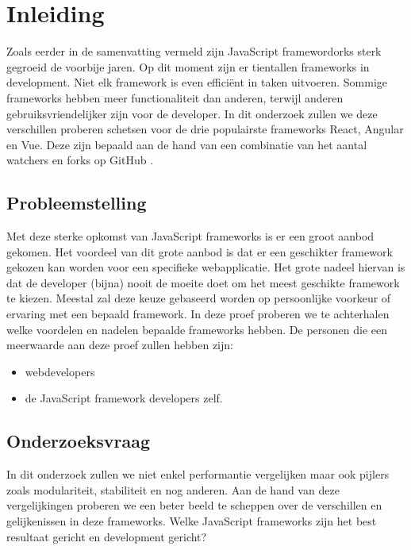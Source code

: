 
\chapter{Inleiding}
\label{ch:inleiding}

Zoals eerder in de samenvatting vermeld zijn JavaScript framewordorks sterk gegroeid de voorbije jaren. Op dit moment zijn er tientallen frameworks in development. Niet elk framework is even efficiënt in taken uitvoeren. Sommige frameworks hebben meer functionaliteit dan anderen, terwijl anderen gebruiksvriendelijker zijn voor de developer. In dit onderzoek zullen we deze verschillen proberen schetsen voor de drie populairste frameworks React, Angular en Vue. Deze zijn bepaald aan de hand van een combinatie van het aantal watchers en forks op GitHub \autocite{github_front-end_????}.

\section{Probleemstelling}
\label{sec:probleemstelling}

Met deze sterke opkomst van JavaScript frameworks is er een groot aanbod gekomen. Het voordeel van dit grote aanbod is dat er een geschikter framework gekozen kan worden voor een specifieke webapplicatie. Het grote nadeel hiervan is dat de developer (bijna) nooit de moeite doet om het meest geschikte framework te kiezen. Meestal zal deze keuze gebaseerd worden op persoonlijke voorkeur of ervaring met een bepaald framework. In deze proef proberen we te achterhalen welke voordelen en nadelen bepaalde frameworks hebben. De personen die een meerwaarde aan deze proef zullen hebben zijn:

\begin{itemize}
	\item webdevelopers
	\item de JavaScript framework developers zelf.
\end{itemize}

\section{Onderzoeksvraag}
\label{sec:onderzoeksvraag}

In dit onderzoek zullen we niet enkel performantie vergelijken maar ook pijlers zoals modulariteit, stabiliteit en nog anderen. Aan de hand van deze vergelijkingen proberen we een beter beeld te scheppen over de verschillen en gelijkenissen in deze frameworks. Welke JavaScript frameworks zijn het best resultaat gericht en development gericht?

